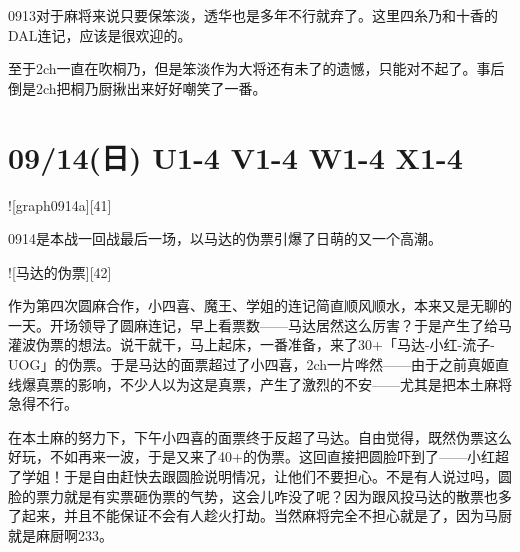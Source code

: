 0913对于麻将来说只要保笨淡，透华也是多年不行就弃了。这里四糸乃和十香的DAL连记，应该是很欢迎的。

至于2ch一直在吹桐乃，但是笨淡作为大将还有未了的遗憾，只能对不起了。事后倒是2ch把桐乃厨揪出来好好嘲笑了一番。

\section{09/14(日) U1-4 V1-4 W1-4 X1-4}


![graph0914a][41]

0914是本战一回战最后一场，以马达的伪票引爆了日萌的又一个高潮。

![马达的伪票][42]

作为第四次圆麻合作，小四喜、魔王、学姐的连记简直顺风顺水，本来又是无聊的一天。开场领导了圆麻连记，早上看票数——马达居然这么厉害？于是产生了给马灌波伪票的想法。说干就干，马上起床，一番准备，来了30+「马达-小红-流子-UOG」的伪票。于是马达的面票超过了小四喜，2ch一片哗然——由于之前真姬直线爆真票的影响，不少人以为这是真票，产生了激烈的不安——尤其是把本土麻将急得不行。

在本土麻的努力下，下午小四喜的面票终于反超了马达。自由觉得，既然伪票这么好玩，不如再来一波，于是又来了40+的伪票。这回直接把圆脸吓到了——小红超了学姐！于是自由赶快去跟圆脸说明情况，让他们不要担心。不是有人说过吗，圆脸的票力就是有实票砸伪票的气势，这会儿咋没了呢？因为跟风投马达的散票也多了起来，并且不能保证不会有人趁火打劫。当然麻将完全不担心就是了，因为马厨就是麻厨啊233。

